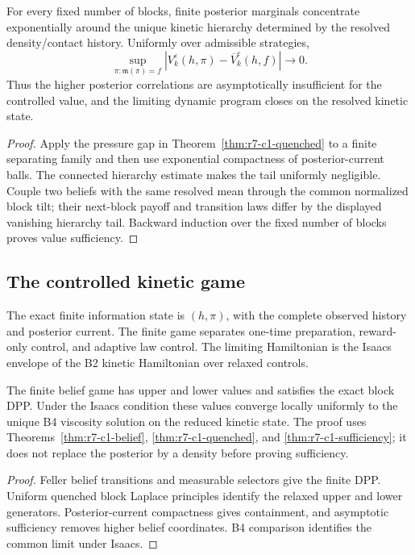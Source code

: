 \begin{theorem}
\label{thm:r7-c1-sufficiency}
For every fixed number of blocks, finite posterior marginals concentrate
exponentially around the unique kinetic hierarchy determined by the resolved
density/contact history.  Uniformly over admissible strategies,
\[
 \sup_{\pi:\mathfrak m(\pi)=f}
 |V_k^\varepsilon(h,\pi)-\overline V_k^\varepsilon(h,f)|
 \longrightarrow0.
\]
Thus the higher posterior correlations are asymptotically insufficient for the
controlled value, and the limiting dynamic program closes on the resolved
kinetic state.
\end{theorem}

\begin{proof}
Apply the pressure gap in
Theorem~\ref{thm:r7-c1-quenched} to a finite separating family and then use
exponential compactness of posterior-current balls.  The connected hierarchy
estimate makes the tail uniformly negligible.  Couple two beliefs with the
same resolved mean through the common normalized block tilt; their next-block
payoff and transition laws differ by the displayed vanishing hierarchy tail.
Backward induction over the fixed number of blocks proves value sufficiency.
\end{proof}

\subsection{The controlled kinetic game}

The exact finite information state is $(h,\pi)$, with the complete observed
history and posterior current.  The finite game separates one-time
preparation, reward-only control, and adaptive law control.  The limiting
Hamiltonian is the Isaacs envelope of the B2 kinetic Hamiltonian over relaxed
controls.

\begin{theorem}
\label{thm:r7-c1-dpp}
The finite belief game has upper and lower values and satisfies the exact block
DPP.  Under the Isaacs condition these values converge locally uniformly to
the unique B4 viscosity solution on the reduced kinetic state.  The proof uses
Theorems~\ref{thm:r7-c1-belief},
\ref{thm:r7-c1-quenched}, and
\ref{thm:r7-c1-sufficiency}; it does not replace the posterior by a density
before proving sufficiency.
\end{theorem}

\begin{proof}
Feller belief transitions and measurable selectors give the finite DPP.
Uniform quenched block Laplace principles identify the relaxed upper and lower
generators.  Posterior-current compactness gives containment, and asymptotic
sufficiency removes higher belief coordinates.  B4 comparison identifies the
common limit under Isaacs.
\end{proof}

